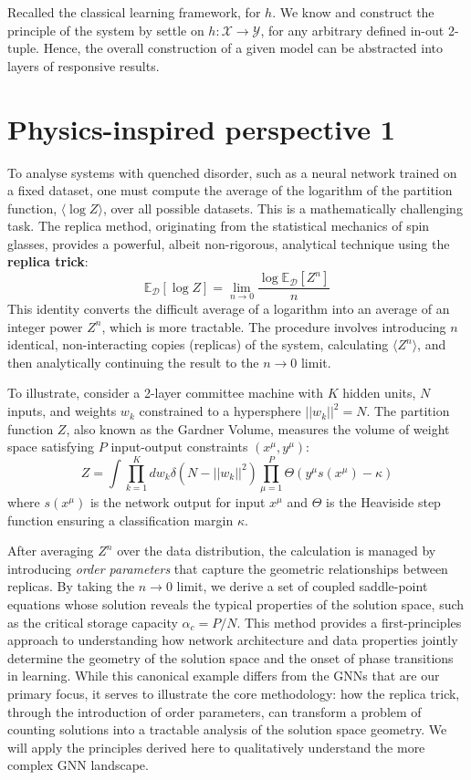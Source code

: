 \documentclass[twoside,10pt]{article}
\begin{document}
Recalled the classical learning framework, for $h$. We know and construct the principle of the system by settle on $h:\mathcal{X}\to \mathcal{Y}$, for any arbitrary defined in-out 2-tuple. Hence, the overall construction of a given model can be abstracted into layers of responsive results. 
\clearpage

\section{Physics-inspired perspective 1}
To analyse systems with quenched disorder, such as a neural network trained on a fixed dataset, one must compute the average of the logarithm of the partition function, $\langle\log Z\rangle$, over all possible datasets. This is a mathematically challenging task. The replica method, originating from the statistical mechanics of spin glasses, provides a powerful, albeit non-rigorous, analytical technique using the \textbf{replica trick}:
\begin{equation}
    \mathbb{E}_{\mathcal{D}}[\log Z] = \lim_{n \to 0} \frac{\log \mathbb{E}_{\mathcal{D}}[Z^n]}{n}
\end{equation}
This identity converts the difficult average of a logarithm into an average of an integer power $Z^n$, which is more tractable. The procedure involves introducing $n$ identical, non-interacting copies (replicas) of the system, calculating $\langle Z^n \rangle$, and then analytically continuing the result to the $n \to 0$ limit.

To illustrate, consider a 2-layer committee machine with $K$ hidden units, $N$ inputs, and weights $w_k$ constrained to a hypersphere $||w_k||^2 = N$. The partition function $Z$, also known as the Gardner Volume, measures the volume of weight space satisfying $P$ input-output constraints $(x^\mu, y^\mu)$:
\begin{equation}
    Z = \int \prod_{k=1}^{K} dw_k \delta(N - ||w_k||^2) \prod_{\mu=1}^{P} \Theta(y^\mu s(x^\mu) - \kappa)
\end{equation}
where $s(x^\mu)$ is the network output for input $x^\mu$ and $\Theta$ is the Heaviside step function ensuring a classification margin $\kappa$.

After averaging $Z^n$ over the data distribution, the calculation is managed by introducing \textit{order parameters} that capture the geometric relationships between replicas. By taking the $n \to 0$ limit, we derive a set of coupled saddle-point equations whose solution reveals the typical properties of the solution space, such as the critical storage capacity $\alpha_c = P/N$. This method provides a first-principles approach to understanding how network architecture and data properties jointly determine the geometry of the solution space and the onset of phase transitions in learning. While this canonical example differs from the GNNs that are our primary focus, it serves to illustrate the core methodology: how the replica trick, through the introduction of order parameters, can transform a problem of counting solutions into a tractable analysis of the solution space geometry. We will apply the principles derived here to qualitatively understand the more complex GNN landscape.
\end{document}
